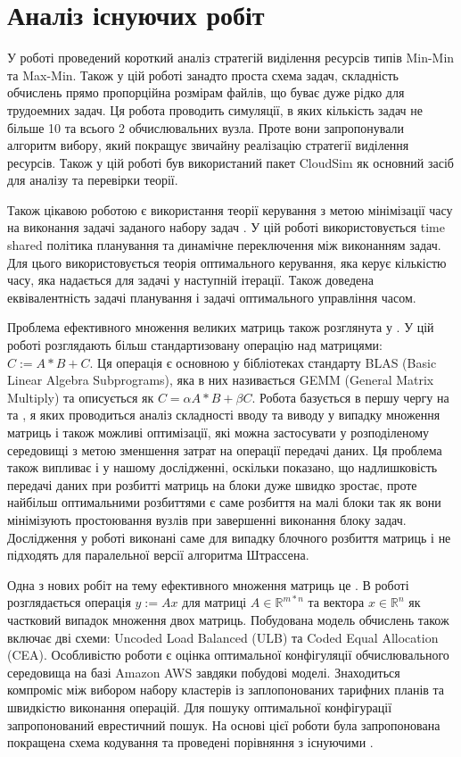 \section{Аналіз існуючих робіт}

У роботі \cite{AppSelAlgoFEffResProvInCloud} проведений короткий аналіз стратегій виділення ресурсів типів Min-Min та Max-Min. Також у цій роботі занадто проста схема задач, складність обчислень прямо пропорційна розмірам файлів, що буває дуже рідко для трудоемних задач. Ця робота проводить симуляції, в яких кількість задач не більше 10 та всього 2 обчислювальних вузла. Проте вони запропонували алгоритм вибору, який покращує звичайну реалізацію стратегії виділення ресурсів. Також у цій роботі був використаний пакет CloudSim як основний засіб для аналізу та перевірки теорії.

Також цікавою роботою є використання теорії керування з метою мінімізації часу на виконання задачі заданого набору задач \cite{Prasanna1991GeneralisedMS}. У цій роботі використовується time shared політика планування та динамічне переключення між виконанням задач. Для цього використовується теорія оптимального керування, яка керує кількістю часу, яка надається для задачі у наступній ітерації. Також доведена еквівалентність задачі планування і задачі оптимального управління часом.

Проблема ефективного множення великих матриць також розглянута у \cite{PushingTheBoundsOfMatrixMatrix}. У цій роботі розглядають більш стандартизовану операцію над матрицями: $C := A*B + C$. Ця операція є основною у бібліотеках стандарту BLAS (Basic Linear Algebra Subprograms), яка в них називається GEMM (General Matrix Multiply) та описується як $C = \alpha A*B + \beta C$. Робота базується в першу чергу на \cite{IOComplexityMatrixMatrix} та \cite{Irony}, я яких проводиться аналіз складності вводу та виводу у випадку множення матриць і також можливі оптимізації, які можна застосувати у розподіленому середовищі з метою зменшення затрат на операції передачі даних. Ця проблема також випливає і у нашому дослідженні, оскільки показано, що надлишковість передачі даних при розбитті матриць на блоки дуже швидко зростає, проте найбільш оптимальними розбиттями є саме розбиття на малі блоки так як вони мінімізують простоювання вузлів при завершенні виконання блоку задач. Дослідження у роботі виконані саме для випадку блочного розбиття матриць і не підходять для паралельної версії алгоритма Штрассена.

Одна з нових робіт на тему ефективного множення матриць це \cite{CodedHeterogeneousMatrixMatrix}. В роботі розглядається операція $y:=Ax$ для матриці $A \in \mathbb{R}^{m*n}$ та вектора $x \in \mathbb{R}^{n}$ як частковий випадок множення двох матриць. Побудована модель обчислень також включає дві схеми: Uncoded Load Balanced (ULB) та Coded Equal Allocation (CEA). Особливістю роботи є оцінка оптимальної конфігуляції обчислювального середовища на базі Amazon AWS завдяки побудові моделі. Знаходиться компроміс між вибором набору кластерів із заплопонованих тарифних планів та швидкістю виконання операцій. Для пошуку оптимальної конфігурації запропонований еврестичний пошук. На основі цієї роботи була запропонована покращена схема кодування та проведені порівняння з існуючими \cite{CodedHeterogeneousMatrixMatrix2}.

